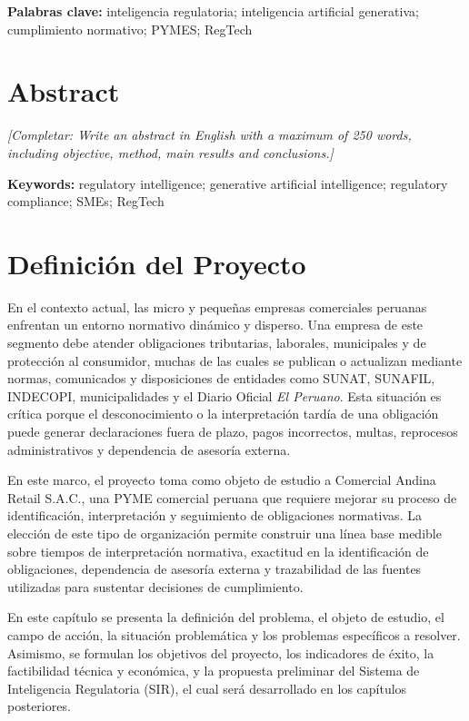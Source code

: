\documentclass[12pt,a4paper,oneside]{report}
\newcommand{\placeholder}[1]{\textit{[Completar: #1]}}
\begin{document}
\noindent\textbf{Palabras clave:} inteligencia regulatoria; inteligencia artificial generativa; cumplimiento normativo; PYMES; RegTech

\chapter*{Abstract}
\placeholder{Write an abstract in English with a maximum of 250 words, including objective, method, main results and conclusions.}

\noindent\textbf{Keywords:} regulatory intelligence; generative artificial intelligence; regulatory compliance; SMEs; RegTech

\clearpage
\tableofcontents
\clearpage
\listoftables
\clearpage
\listoffigures
\clearpage
{}


\chapter{Definición del Proyecto}\label{cap:1-definicion-del-proyecto}

En el contexto actual, las micro y pequeñas empresas comerciales peruanas enfrentan un entorno normativo dinámico y disperso. Una empresa de este segmento debe atender obligaciones tributarias, laborales, municipales y de protección al consumidor, muchas de las cuales se publican o actualizan mediante normas, comunicados y disposiciones de entidades como SUNAT, SUNAFIL, INDECOPI, municipalidades y el Diario Oficial \textit{El Peruano}. Esta situación es crítica porque el desconocimiento o la interpretación tardía de una obligación puede generar declaraciones fuera de plazo, pagos incorrectos, multas, reprocesos administrativos y dependencia de asesoría externa.

En este marco, el proyecto toma como objeto de estudio a Comercial Andina Retail S.A.C., una PYME comercial peruana que requiere mejorar su proceso de identificación, interpretación y seguimiento de obligaciones normativas. La elección de este tipo de organización permite construir una línea base medible sobre tiempos de interpretación normativa, exactitud en la identificación de obligaciones, dependencia de asesoría externa y trazabilidad de las fuentes utilizadas para sustentar decisiones de cumplimiento.

En este capítulo se presenta la definición del problema, el objeto de estudio, el campo de acción, la situación problemática y los problemas específicos a resolver. Asimismo, se formulan los objetivos del proyecto, los indicadores de éxito, la factibilidad técnica y económica, y la propuesta preliminar del Sistema de Inteligencia Regulatoria (SIR), el cual será desarrollado en los capítulos posteriores.
\end{document}

